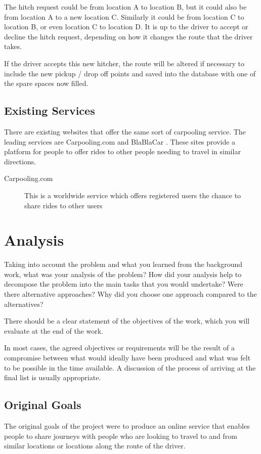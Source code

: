 	The hitch request could be from location A to location B, but it could also be from location A to a new location C. Similarly it could be from location C to location B, or even location C to location D. It is up to the driver to accept or decline the hitch request, depending on how it changes the route that the driver takes.
	
	If the driver accepts this new hitcher, the route will be altered if necessary to include the new pickup / drop off points and saved into the database with one of the spare spaces now filled.
	 
\subsection{Existing Services}
	There are existing websites that offer the same sort of carpooling service. The leading services are Carpooling.com \cite{carpooling_com} and BlaBlaCar \cite{blabla}. These sites provide a platform for people to offer rides to other people needing to travel in similar directions.
	
	\begin{description}
	\item[Carpooling.com] This is a worldwide service which offers registered users the chance to share rides to other users
	\end{description}
	

\section{Analysis}
Taking into account the problem and what you learned from the background work, what was your analysis of the problem? How did your analysis help to decompose the problem into the main tasks that you would undertake? Were there alternative approaches? Why did you choose one approach compared to the alternatives? 

There should be a clear statement of the objectives of the work, which you will evaluate at the end of the work. 

In most cases, the agreed objectives or requirements will be the result of a compromise between what would ideally have been produced and what was felt to be possible in the time available. A discussion of the process of arriving at the final list is usually appropriate.

\subsection{Original Goals}
	The original goals of the project were to produce an online service that enables people to share journeys with people who are looking to travel to and from similar locations or locations along the route of the driver. 
	
